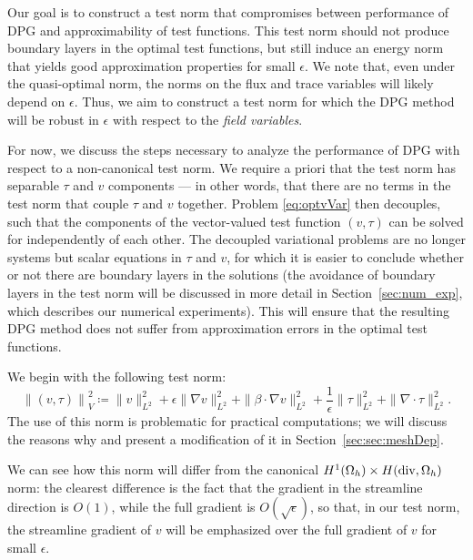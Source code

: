 \documentclass[11pt,onecolumn]{scrartcl}
\newcommand{\eqnref}[1]{\eqref{eq:#1}}
\newcommand{\secref}[1]{\ref{sec:#1}}
\newcommand{\grad}{\nabla}
\renewcommand{\div}{\grad \cdot}
\begin{document}
Our goal is to construct a test norm that compromises between performance of DPG and approximability of test functions.  This test norm should not produce boundary layers in the optimal test functions, but still induce an energy norm that yields good approximation properties for small $\epsilon$. We note that, even under the quasi-optimal norm, the norms on the flux and trace variables will likely depend on $\epsilon$. Thus, we aim to construct a test norm for which the DPG method will be robust in $\epsilon$ with respect to the \emph{field variables}. 

For now, we discuss the steps necessary to analyze the performance of DPG with respect to a non-canonical test norm. We require a priori that the test norm has separable $\tau$ and $v$ components --- in other words, that there are no terms in the test norm that couple $\tau$ and $v$ together. Problem \eqnref{optvVar} then decouples, such that the components of the vector-valued test function $\left(v,\tau\right)$ can be solved for independently of each other. The decoupled variational problems are no longer systems but scalar equations in $\tau$ and $v$, for which it is easier to conclude whether or not there are boundary layers in the solutions (the avoidance of boundary layers in the test norm will be discussed in more detail in Section~\ref{sec:num_exp}, which describes our numerical experiments). This will ensure that the resulting DPG method does not suffer from approximation errors in the optimal test functions.

We begin with the following test norm:
\[
\left\|\left(v,\tau\right)\right\|^2_V \coloneqq \|v\|_{L^2}^2 + \epsilon\|\grad v\|_{L^2}^2 + \|\beta \cdot \grad v\|_{L^2}^2  + \frac{1}{\epsilon}\|\tau\|_{L^2}^2 + \|\div \tau\|_{L^2}^2.
\]
The use of this norm is problematic for practical computations; we will discuss the reasons why and present a modification of it in Section~\secref{sec:meshDep}. 

We can see how this norm will differ from the canonical $H^1(\Omega_h)\times H({\rm div},\Omega_h)$ norm: the clearest difference is the fact that the gradient in the streamline direction is $O(1)$, while the full gradient is $O(\sqrt{\epsilon})$, so that, in our test norm, the streamline gradient of $v$ will be emphasized over the full gradient of $v$ for small $\epsilon$. 
\end{document}
